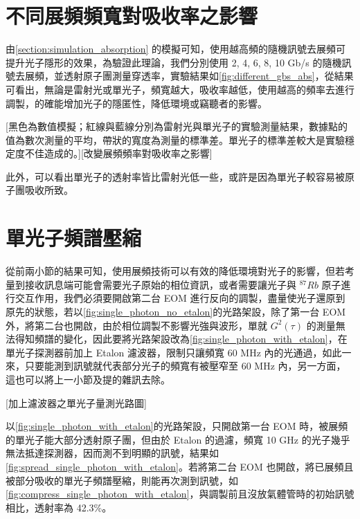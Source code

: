 \documentclass[class=NCU_thesis, crop=false]{standalone}
\begin{document}
\section{不同展頻頻寬對吸收率之影響}
由\cref{section:simulation_absorption} 的模擬可知，使用越高頻的隨機訊號去展頻可提升光子隱形的效果，為驗證此理論，我們分別使用 2, 4, 6, 8, 10 Gb/s 的隨機訊號去展頻，並透射原子團測量穿透率，實驗結果如\cref{fig:different_gbs_abs}，從結果可看出，無論是雷射光或單光子，頻寬越大，吸收率越低，使用越高的頻率去進行調製，的確能增加光子的隱匿性，降低環境或竊聽者的影響。

[黑色為數值模擬；紅線與藍線分別為雷射光與單光子的實驗測量結果，數據點的值為數次測量的平均，帶狀的寬度為測量的標準差。單光子的標準差較大是實驗穩定度不佳造成的。][改變展頻頻率對吸收率之影響]

此外，可以看出單光子的透射率皆比雷射光低一些，或許是因為單光子較容易被原子團吸收所致。

\section{單光子頻譜壓縮}

從前兩小節的結果可知，使用展頻技術可以有效的降低環境對光子的影響，但若考量到接收訊息端可能會需要光子原始的相位資訊，或者需要讓光子與 $^{87}Rb$ 原子進行交互作用，我們必須要開啟第二台 EOM 進行反向的調製，盡量使光子還原到原先的狀態，若以\cref{fig:single_photon_no_etalon}的光路架設，除了第一台 EOM 外，將第二台也開啟，由於相位調製不影響光強與波形，單就 $G^{2}(\tau)$ 的測量無法得知頻譜的變化，因此要將光路架設改為\cref{fig:single_photon_with_etalon}，在單光子探測器前加上 Etalon 濾波器，限制只讓頻寬 60 MHz 內的光通過，如此一來，只要能測到訊號就代表部分光子的頻寬有被壓窄至 60 MHz 內，另一方面，這也可以將上一小節及提的雜訊去除。

[加上濾波器之單光子量測光路圖]

以\cref{fig:single_photon_with_etalon}的光路架設，只開啟第一台 EOM 時，被展頻的單光子能大部分透射原子團，但由於 Etalon 的過濾，頻寬 10 GHz 的光子幾乎無法抵達探測器，因而測不到明顯的訊號，結果如\cref{fig:spread_single_photon_with_etalon}。若將第二台 EOM 也開啟，將已展頻且被部分吸收的單光子頻譜壓縮，則能再次測到訊號，如\cref{fig:compress_single_photon_with_etalon}，與調製前且沒放氣體管時的初始訊號相比，透射率為 42.3\%。
\end{document}
